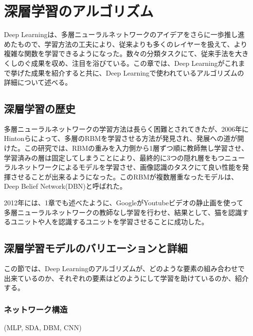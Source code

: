 \chapter{深層学習のアルゴリズム}
Deep Learningは、多層ニューラルネットワークのアイデアをさらに一歩推し進めたもので、学習方法の工夫により、従来よりも多くのレイヤーを扱えて、より複雑な関数を学習できるようになった。数々の分類タスクにて、従来手法を大きくしのぐ成果を収め、注目を浴びている。この章では、Deep Learningがこれまで挙げた成果を紹介すると共に、Deep Learningで使われているアルゴリズムの詳細について述べる。

\section{深層学習の歴史}
多層ニューラルネットワークの学習方法は長らく困難とされてきたが、2006年にHintonらによって、多層のRBMを学習させる方法が発見され、発展への道が開けた\cite{hinton2006a-fast}。この研究では、RBMの重みを入力側から1層ずつ順に教師無し学習させ、学習済みの層は固定してしまうことにより、最終的に3つの隠れ層をもつニューラルネットワークによるモデルを学習させ、画像認識のタスクにて良い性能を発揮させることが出来るようになった。このRBMが複数層重なったモデルは、Deep Belief Network(DBN)と呼ばれた。\par
2012年には、1章でも述べたように、GoogleがYoutubeビデオの静止画を使って多層ニューラルネットワークの教師なし学習を行わせ、結果として、猫を認識するユニットや人を認識するユニットを学習させることに成功した。\par

\section{深層学習モデルのバリエーションと詳細}
この節では、Deep Learningのアルゴリズムが、どのような要素の組み合わせで出来ているのか、それぞれの要素はどのようにして学習を助けているのか、紹介する。
\subsection{ネットワーク構造}
(MLP, SDA, DBM, CNN)
